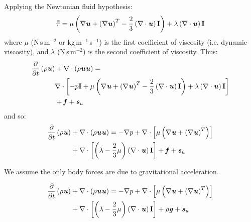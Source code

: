 Applying the Newtonian fluid hypothesis:
\begin{equation}
\bar{\bar{{\tau}}} = \mu \left( \nabla \textbf{\textit{u}} + \left(\nabla \textbf{\textit{u}} \right)^T - \frac{2}{3} \left(\nabla \cdot \textbf{\textit{u}} \right) \textbf{I} \right) + \lambda \left(\nabla \cdot \textbf{\textit{u}} \right)\textbf{I}
\end{equation}
where $\mu$ (N\,s\,m$^{-2}$ or kg\,m$^{-1}$\,s$^{-1}$) is the first coefficient of viscosity (i.e. dynamic viscosity), and $\lambda$ (N\,s\,m$^{-2}$) is the second coefficient of viscosity. Thus:
\begin{equation}
\begin{split}
\frac{\partial}{\partial t} \left(\rho \textbf{\textit{u}} \right) &+ \nabla \cdot \left(\rho \textbf{\textit{u}}\textbf{\textit{u}} \right) = \\
&\nabla \cdot \left[ -p\textbf{I} + \mu \left( \nabla \textbf{\textit{u}} + \left(\nabla \textbf{\textit{u}} \right)^T - \frac{2}{3} \left(\nabla \cdot \textbf{\textit{u}} \right) \textbf{I} \right) + \lambda \left(\nabla \cdot \textbf{\textit{u}} \right)\textbf{I}\right]\\
& + \textbf{\textit{f}} +  \textbf{\textit{s}}_{u}
\end{split}
\end{equation}
and so:
\begin{equation}
\begin{split}
\frac{\partial}{\partial t} \left(\rho \textbf{\textit{u}} \right) &+ \nabla \cdot \left(\rho \textbf{\textit{u}}\textbf{\textit{u}} \right) = - \nabla p + \nabla \cdot \left[ \mu \left( \nabla \textbf{\textit{u}} + \left(\nabla \textbf{\textit{u}} \right)^T \right) \right] \\
& + \nabla \cdot \left[ \left( \lambda - \frac{2}{3}\mu \right) \left(\nabla \cdot \textbf{\textit{u}} \right) \textbf{I} \right] +  \textbf{\textit{f}} +  \textbf{\textit{s}}_{u}
\end{split}
\end{equation}

\begin{assumption}
We assume the only body forces are due to gravitational acceleration.
\end{assumption}

\begin{equation}
\begin{split}
\frac{\partial}{\partial t} \left(\rho \textbf{\textit{u}} \right) &+ \nabla \cdot \left(\rho \textbf{\textit{u}}\textbf{\textit{u}} \right) = - \nabla p + \nabla \cdot \left[ \mu \left( \nabla \textbf{\textit{u}} + \left(\nabla \textbf{\textit{u}} \right)^T \right) \right] \\
& + \nabla \cdot \left[ \left( \lambda - \frac{2}{3}\mu \right) \left(\nabla \cdot \textbf{\textit{u}} \right) \textbf{I} \right] +  \rho \textbf{\textit{g}} +  \textbf{\textit{s}}_{u}
\end{split}
\end{equation}

